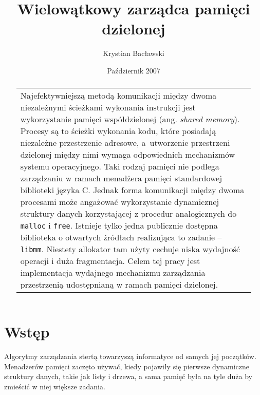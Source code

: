 \documentclass[12pt,a4paper,titlepage,twoside]{mwart}
\author{Krystian Bacławski}
\title{Wielowątkowy zarządca pamięci dzielonej}
\date{Październik 2007}
\begin{document}
\maketitle
\cleardoublepage


\begin{abstract}
\vspace{2ex}
\begin{center}
\begin{tabularx}{0.75\textwidth}{X}
Najefektywniejszą metodą komunikacji między dwoma niezależnymi ścieżkami
wykonania instrukcji jest wykorzystanie pamięci współdzielonej (ang.
\textit{shared memory}). Procesy są to ścieżki wykonania kodu, które posiadają
niezależne przestrzenie adresowe, a~utworzenie przestrzeni dzielonej między
nimi wymaga odpowiednich mechanizmów systemu operacyjnego. Taki rodzaj pamięci
nie podlega zarządzaniu w ramach menadżera pamięci standardowej biblioteki
języka C. Jednak forma komunikacji między dwoma procesami może angażować
wykorzystanie dynamicznej struktury danych korzystającej z procedur
analogicznych do \texttt{malloc} i \texttt{free}. Istnieje tylko jedna
publicznie dostępna biblioteka o otwartych źródłach realizująca to zadanie --
\texttt{libmm}. Niestety allokator tam użyty cechuje niska wydajność operacji i
duża fragmentacja. Celem tej pracy jest implementacja wydajnego mechanizmu
zarządzania przestrzenią udostępnianą w ramach pamięci dzielonej. 
\end{tabularx}
\end{center}
\end{abstract}

\cleardoublepage


\tableofcontents
\cleardoublepage


\setlength{\parindent}{0pt}
\setlength{\parskip}{1.2ex plus 0.5ex minus 0.2ex}

\section{Wstęp}

Algorytmy zarządzania stertą towarzyszą informatyce od samych jej początków.
Menadżerów pamięci zaczęto używać, kiedy pojawiły się pierwsze dynamiczne
struktury danych, takie jak listy i drzewa, a sama pamięć była na tyle duża by
zmieścić w niej większe zadania.
\end{document}
